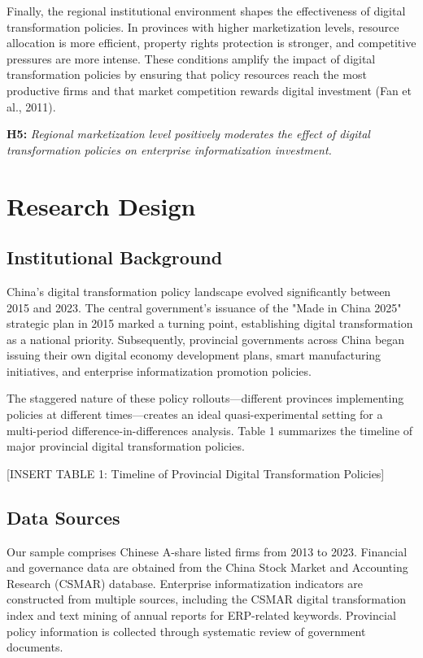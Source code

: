 \documentclass[12pt]{article}
\begin{document}
Finally, the regional institutional environment shapes the effectiveness of digital transformation policies. In provinces with higher marketization levels, resource allocation is more efficient, property rights protection is stronger, and competitive pressures are more intense. These conditions amplify the impact of digital transformation policies by ensuring that policy resources reach the most productive firms and that market competition rewards digital investment (Fan et al., 2011).

\noindent\textbf{H5:} \textit{Regional marketization level positively moderates the effect of digital transformation policies on enterprise informatization investment.}

\section{Research Design}

\subsection{Institutional Background}

China's digital transformation policy landscape evolved significantly between 2015 and 2023. The central government's issuance of the "Made in China 2025" strategic plan in 2015 marked a turning point, establishing digital transformation as a national priority. Subsequently, provincial governments across China began issuing their own digital economy development plans, smart manufacturing initiatives, and enterprise informatization promotion policies.

The staggered nature of these policy rollouts—different provinces implementing policies at different times—creates an ideal quasi-experimental setting for a multi-period difference-in-differences analysis. Table 1 summarizes the timeline of major provincial digital transformation policies.

[INSERT TABLE 1: Timeline of Provincial Digital Transformation Policies]

\subsection{Data Sources}

Our sample comprises Chinese A-share listed firms from 2013 to 2023. Financial and governance data are obtained from the China Stock Market and Accounting Research (CSMAR) database. Enterprise informatization indicators are constructed from multiple sources, including the CSMAR digital transformation index and text mining of annual reports for ERP-related keywords. Provincial policy information is collected through systematic review of government documents.
\end{document}
